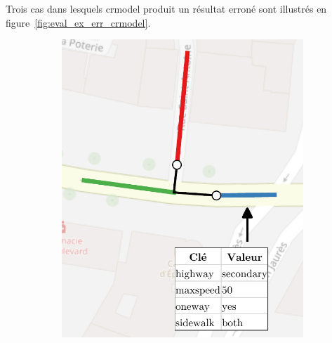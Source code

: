 Trois cas dans lesquels crmodel produit un résultat erroné sont illustrés en figure~\ref{fig:eval_ex_err_crmodel}.

\begin{figure}[ht]
    \centering
    \begin{subfigure}[t]{.3\linewidth}
        \centering
        \includegraphics[width=\linewidth]{images/evaluation/crmodel/eval_cas1.pdf}
        \caption{}
    \end{subfigure}
    \begin{subfigure}[t]{.3\linewidth}
        \centering

\end{subfigure}
\end{figure}
